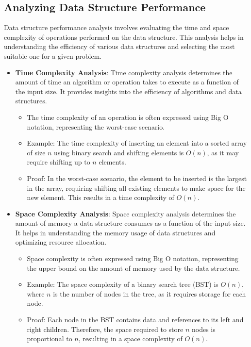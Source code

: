 \documentclass[12pt]{book} %
\begin{document}
\subsection{Analyzing Data Structure Performance}
Data structure performance analysis involves evaluating the time and space complexity of operations performed on the data structure. This analysis helps in understanding the efficiency of various data structures and selecting the most suitable one for a given problem.

\begin{itemize}
    \item \textbf{Time Complexity Analysis}: Time complexity analysis determines the amount of time an algorithm or operation takes to execute as a function of the input size. It provides insights into the efficiency of algorithms and data structures.
    \begin{itemize}
        \item The time complexity of an operation is often expressed using Big O notation, representing the worst-case scenario.
        \item Example: The time complexity of inserting an element into a sorted array of size \(n\) using binary search and shifting elements is \(O(n)\), as it may require shifting up to \(n\) elements.
        \item Proof: In the worst-case scenario, the element to be inserted is the largest in the array, requiring shifting all existing elements to make space for the new element. This results in a time complexity of \(O(n)\).
    \end{itemize}
    \item \textbf{Space Complexity Analysis}: Space complexity analysis determines the amount of memory a data structure consumes as a function of the input size. It helps in understanding the memory usage of data structures and optimizing resource allocation.
    \begin{itemize}
        \item Space complexity is often expressed using Big O notation, representing the upper bound on the amount of memory used by the data structure.
        \item Example: The space complexity of a binary search tree (BST) is \(O(n)\), where \(n\) is the number of nodes in the tree, as it requires storage for each node.
        \item Proof: Each node in the BST contains data and references to its left and right children. Therefore, the space required to store \(n\) nodes is proportional to \(n\), resulting in a space complexity of \(O(n)\).
    \end{itemize}
\end{itemize}
\end{document}
